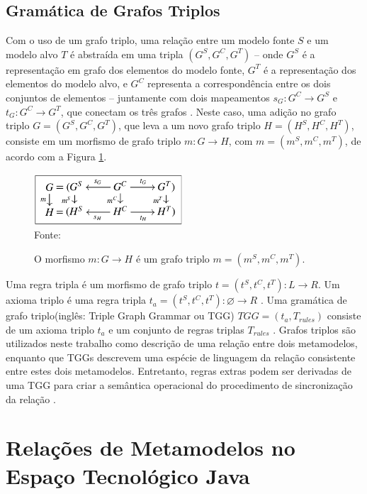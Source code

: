 \documentclass[cic,resumo-unibral]{iiufrgs}
\begin{document}
\begin{extendedsummary}
\subsection{Gramática de Grafos Triplos}
Com o uso de um grafo triplo, uma relação entre um modelo fonte $S$ e um modelo alvo $T$ é abstraída em uma tripla $(G^S,G^C,G^T)$ – onde $G^S$ é a representação em grafo dos elementos do modelo fonte, $G^T$ é a representação dos elementos do modelo alvo, e $G^C$ representa a correspondência entre os dois conjuntos de elementos – juntamente com dois mapeamentos $s_G: G^C \rightarrow G^S$ e $t_G: G^C \rightarrow G^T$, que conectam os três grafos \citep{hermann2011correctness}. Neste caso, uma adição no grafo triplo $G = (G^S,G^C,G^T)$, que leva a um novo grafo triplo $H = (H^S,H^C,H^T)$, consiste em um morfismo de grafo triplo $m: G \rightarrow H$, com $m = (m^S,m^C,m^T)$, de acordo com a Figura \ref{fig:tg_morphism}.
\begin{figure}[h]
	\centering
	\caption{O morfismo $m: G \rightarrow H$ é um grafo triplo $m =  (m^S,m^C,m^T)$.}
	\includegraphics[width=15em]{tg_morphism}\\
	Fonte: \citep{hermann2011correctness}
	\label{fig:tg_morphism}
\end{figure}

Uma regra tripla é um morfismo de grafo triplo $t = (t^S,t^C,t^T) : L \rightarrow R$. Um axioma triplo é uma regra tripla $t_a = (t^S,t^C,t^T) : \varnothing \rightarrow R$ \cite{ehrig2007information}. Uma gramática de grafo triplo(inglês: Triple Graph Grammar ou TGG) $TGG = (t_a, T_{rules})$ consiste de um axioma triplo $t_a$ e um conjunto de regras triplas $T_{rules}$ \cite[p. 4]{giese2010toward}. Grafos triplos são utilizados neste trabalho como descrição de uma relação entre dois metamodelos, enquanto que TGGs descrevem uma espécie de linguagem da relação consistente entre estes dois metamodelos. Entretanto, regras extras podem ser derivadas de uma TGG para criar a semântica operacional do procedimento de sincronização da relação \cite{giese2010toward}.

\section{Relações de Metamodelos no Espaço Tecnológico Java}


\end{extendedsummary}
\end{document}
